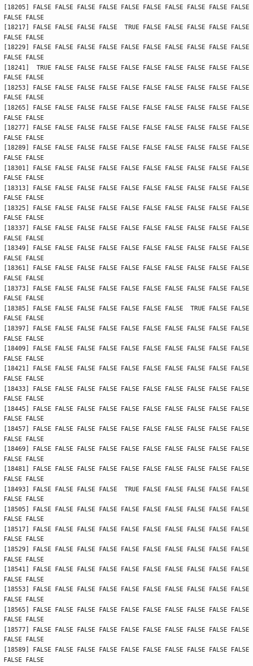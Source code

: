 \documentclass[
  a4paper,
  DIV=11,
  numbers=noendperiod]{scrartcl}
\begin{document}
\begin{verbatim}
[18205] FALSE FALSE FALSE FALSE FALSE FALSE FALSE FALSE FALSE FALSE FALSE FALSE
[18217] FALSE FALSE FALSE FALSE  TRUE FALSE FALSE FALSE FALSE FALSE FALSE FALSE
[18229] FALSE FALSE FALSE FALSE FALSE FALSE FALSE FALSE FALSE FALSE FALSE FALSE
[18241]  TRUE FALSE FALSE FALSE FALSE FALSE FALSE FALSE FALSE FALSE FALSE FALSE
[18253] FALSE FALSE FALSE FALSE FALSE FALSE FALSE FALSE FALSE FALSE FALSE FALSE
[18265] FALSE FALSE FALSE FALSE FALSE FALSE FALSE FALSE FALSE FALSE FALSE FALSE
[18277] FALSE FALSE FALSE FALSE FALSE FALSE FALSE FALSE FALSE FALSE FALSE FALSE
[18289] FALSE FALSE FALSE FALSE FALSE FALSE FALSE FALSE FALSE FALSE FALSE FALSE
[18301] FALSE FALSE FALSE FALSE FALSE FALSE FALSE FALSE FALSE FALSE FALSE FALSE
[18313] FALSE FALSE FALSE FALSE FALSE FALSE FALSE FALSE FALSE FALSE FALSE FALSE
[18325] FALSE FALSE FALSE FALSE FALSE FALSE FALSE FALSE FALSE FALSE FALSE FALSE
[18337] FALSE FALSE FALSE FALSE FALSE FALSE FALSE FALSE FALSE FALSE FALSE FALSE
[18349] FALSE FALSE FALSE FALSE FALSE FALSE FALSE FALSE FALSE FALSE FALSE FALSE
[18361] FALSE FALSE FALSE FALSE FALSE FALSE FALSE FALSE FALSE FALSE FALSE FALSE
[18373] FALSE FALSE FALSE FALSE FALSE FALSE FALSE FALSE FALSE FALSE FALSE FALSE
[18385] FALSE FALSE FALSE FALSE FALSE FALSE FALSE  TRUE FALSE FALSE FALSE FALSE
[18397] FALSE FALSE FALSE FALSE FALSE FALSE FALSE FALSE FALSE FALSE FALSE FALSE
[18409] FALSE FALSE FALSE FALSE FALSE FALSE FALSE FALSE FALSE FALSE FALSE FALSE
[18421] FALSE FALSE FALSE FALSE FALSE FALSE FALSE FALSE FALSE FALSE FALSE FALSE
[18433] FALSE FALSE FALSE FALSE FALSE FALSE FALSE FALSE FALSE FALSE FALSE FALSE
[18445] FALSE FALSE FALSE FALSE FALSE FALSE FALSE FALSE FALSE FALSE FALSE FALSE
[18457] FALSE FALSE FALSE FALSE FALSE FALSE FALSE FALSE FALSE FALSE FALSE FALSE
[18469] FALSE FALSE FALSE FALSE FALSE FALSE FALSE FALSE FALSE FALSE FALSE FALSE
[18481] FALSE FALSE FALSE FALSE FALSE FALSE FALSE FALSE FALSE FALSE FALSE FALSE
[18493] FALSE FALSE FALSE FALSE  TRUE FALSE FALSE FALSE FALSE FALSE FALSE FALSE
[18505] FALSE FALSE FALSE FALSE FALSE FALSE FALSE FALSE FALSE FALSE FALSE FALSE
[18517] FALSE FALSE FALSE FALSE FALSE FALSE FALSE FALSE FALSE FALSE FALSE FALSE
[18529] FALSE FALSE FALSE FALSE FALSE FALSE FALSE FALSE FALSE FALSE FALSE FALSE
[18541] FALSE FALSE FALSE FALSE FALSE FALSE FALSE FALSE FALSE FALSE FALSE FALSE
[18553] FALSE FALSE FALSE FALSE FALSE FALSE FALSE FALSE FALSE FALSE FALSE FALSE
[18565] FALSE FALSE FALSE FALSE FALSE FALSE FALSE FALSE FALSE FALSE FALSE FALSE
[18577] FALSE FALSE FALSE FALSE FALSE FALSE FALSE FALSE FALSE FALSE FALSE FALSE
[18589] FALSE FALSE FALSE FALSE FALSE FALSE FALSE FALSE FALSE FALSE FALSE FALSE

\end{verbatim}
\end{document}
